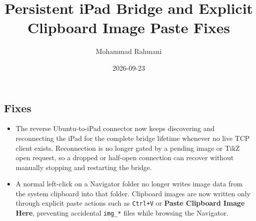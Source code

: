 \documentclass[a4paper]{article}
\title{Persistent iPad Bridge and Explicit Clipboard Image Paste Fixes}
\date{2026-09-23}
\author{Mohammad Rahmani}
\begin{document}
   \maketitle

   \begin{preview}
      \section{Fixes}
      \begin{itemize}
         \item The reverse Ubuntu-to-iPad connector now keeps discovering and reconnecting the iPad for the complete bridge lifetime whenever no live TCP client exists. Reconnection is no longer gated by a pending image or TikZ open request, so a dropped or half-open connection can recover without manually stopping and restarting the bridge.
         \item A normal left-click on a Navigator folder no longer writes image data from the system clipboard into that folder. Clipboard images are now written only through explicit paste actions such as \texttt{Ctrl+V} or \textbf{Paste Clipboard Image Here}, preventing accidental \texttt{img\_*} files while browsing the Navigator.
      \end{itemize}
   \end{preview}

   
   
\end{document}
